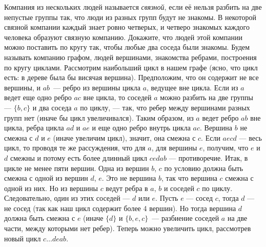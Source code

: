 \problem
Компания из нескольких людей называется \emph{связной}, если её нельзя разбить
на две непустые группы так, что люди из разных групп будут не знакомы.
В некоторой связной компании каждый знает ровно четверых, и четверо знакомых
каждого человека образуют связную компанию.
Докажите, что людей этой компании можно поставить по кругу так, чтобы любые два
соседа были знакомы.
\solution
Будем называть компанию графом, людей вершинами, знакомства ребрами, построения
по кругу циклами.
Рассмотрим наибольший цикл в нашем графе
(ясно, что цикл есть: в дереве была бы висячая вершина).
Предположим, что он содержит не все вершины, и $ab$~--- ребро из вершины цикла
$a$, ведущее вне цикла.
Если из $a$ ведет еще одно ребро $ac$ вне цикла, то соседей $a$ можно разбить
на две группы --- $\{b, c\}$ и два соседа $a$ по циклу, --- так, что ребер
между вершинами разных групп нет (иначе бы цикл увеличивался).
Таким образом, из $a$ ведет ребро $ab$ вне цикла, ребра цикла $ad$ и $ae$ и еще
одно ребро внутрь цикла $ac$.
Вершина $b$ не смежна с $d$ и $e$ (иначе увеличим цикл), значит, она смежна с
$c$.
Если $aecd$ --- весь цикл, то проводя те же рассуждения, что для $a$, для
вершины $e$, получим, что $e$ и $d$ смежны и потому есть более длинный цикл
$cedab$ --- противоречие.
Итак, в цикле не менее пяти вершин.
Одна из вершин $b$, $c$ по условию должна быть смежна с одной из вершин
$d$, $e$.
Это не вершина $b$, так что вершина $c$ смежна с одной из них.
Но из вершины $c$ ведут ребра в $a$, $b$ и соседей $c$ по циклу.
Следовательно, один из этих соседей --- $d$ или $e$.
Пусть $e$ --- сосед $c$, тогда $d$ --- не сосед
(так как наш цикл содержит более 4 вершин).
Но тогда вершина $d$ должна быть смежна с $e$ (иначе $\{d\}$ и $\{b,e,c\}$~---
разбиение соседей $a$ на две части, между которыми нет ребер).
Теперь можно увеличить цикл, рассмотрев новый цикл $c \ldots deab$. 
\endproblem
